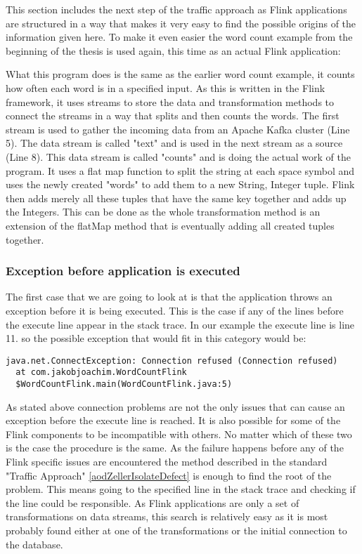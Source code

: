 This section includes the next step of the traffic approach as Flink applications are structured in a way that makes it very easy to find the possible origins of the information given here. To make it even easier the word count example from the beginning of the thesis is used again, this time as an actual Flink application:



What this program does is the same as the earlier word count example, it counts how often each word is in a specified input. As this is written in the Flink framework, it uses streams to store the data and transformation methods to connect the streams in a way that splits and then counts the words. The first stream is used to gather the incoming data from an Apache Kafka cluster (Line 5). The data stream is called "text" and is used in the next stream as a source (Line 8). This data stream is called "counts" and is doing the actual work of the program. It uses a flat map function to split the string at each space symbol and uses the newly created "words" to add them to a new String, Integer tuple. Flink then adds merely all these tuples that have the same key together and adds up the Integers. This can be done as the whole transformation method is an extension of the flatMap method that is eventually adding all created tuples together.

\subsubsection{Exception before application is executed}
The first case that we are going to look at is that the application throws an exception before it is being executed. This is the case if any of the lines before the execute line appear in the stack trace. In our example the execute line is line 11. so the possible exception that would fit in this category would be:

\begin{lstlisting}[caption={Connection Exception}]
java.net.ConnectException: Connection refused (Connection refused)
  at com.jakobjoachim.WordCountFlink
  $WordCountFlink.main(WordCountFlink.java:5)
\end{lstlisting}

As stated above connection problems are not the only issues that can cause an exception before the execute line is reached. It is also possible for some of the Flink components to be incompatible with others. No matter which of these two is the case the procedure is the same. As the failure happens before any of the Flink specific issues are encountered the method described in the standard "Traffic Approach" \ref{aodZellerIsolateDefect} is enough to find the root of the problem. This means going to the specified line in the stack trace and checking if the line could be responsible. As Flink applications are only a set of transformations on data streams, this search is relatively easy as it is most probably found either at one of the transformations or the initial connection to the database.

